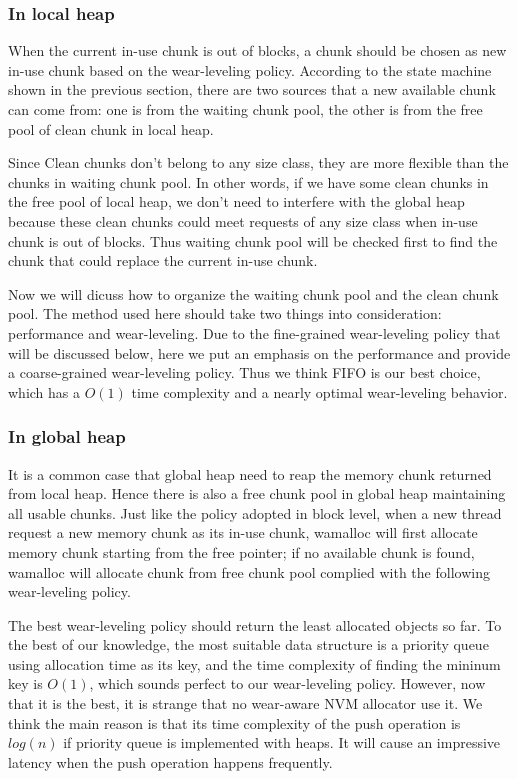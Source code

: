 \documentclass{vldb}
\begin{document}
\subsubsection{In local heap}

When the current in-use chunk is out of blocks, 
a chunk should be chosen as new in-use chunk based on the wear-leveling policy.
According to the state machine shown in the previous section,
there are two sources that a new available chunk can come from:
one is from the waiting chunk pool, the other is from the free pool of clean chunk in local heap.

Since Clean chunks don't belong to any size class, they are more flexible than the chunks in waiting chunk pool.
In other words, if we have some clean chunks in the free pool of local heap, 
we don't need to interfere with the global heap
because these clean chunks could meet requests of any size class when in-use chunk is out of blocks.
Thus waiting chunk pool will be checked first to find the chunk that could replace the current in-use chunk.

Now we will dicuss how to organize the waiting chunk pool and the clean chunk pool.
The method used here should take two things into consideration:
performance and wear-leveling.
Due to the fine-grained wear-leveling policy that will be discussed below,
here we put an emphasis on the performance and provide a coarse-grained wear-leveling policy.
Thus we think FIFO is our best choice, which has a $O(1)$ time complexity and a nearly optimal wear-leveling behavior.

\subsubsection{In global heap}
It is a common case that global heap need to reap the memory chunk returned from local heap.
Hence there is also a free chunk pool in global heap maintaining all usable chunks. 
Just like the policy adopted in block level, 
when a new thread request a new memory chunk as its in-use chunk,
wamalloc will first allocate memory chunk starting from the free pointer; 
if no available chunk is found, wamalloc will allocate chunk from free chunk pool complied with the following wear-leveling policy.

The best wear-leveling policy should return the least allocated objects so far. 
To the best of our knowledge, the most suitable data structure is a priority queue using allocation time as its key,
and the time complexity of finding the mininum key is $O(1)$, which sounds perfect to our wear-leveling policy.
However, now that it is the best, it is strange that no wear-aware NVM allocator use it.
We think the main reason is that its time complexity of the push operation is $log(n)$ if priority queue is implemented with heaps. 
It will cause an impressive latency when the push operation happens frequently.
\end{document}
